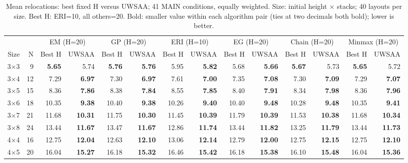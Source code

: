 \begin{table}[t]
\centering\scriptsize
\caption{Mean relocations: best fixed H versus UWSAA; 41 MAIN conditions, equally weighted. Size: initial height $\times$ stacks; 40 layouts per size. Best H: ERI=10, all others=20. Bold: smaller value within each algorithm pair (ties at two decimals both bold); lower is better.}
\setlength{\tabcolsep}{4pt}
\begin{tabular}{rrrrrrrrrrrrrr}
\toprule
 &  & \multicolumn{2}{c}{EM (H=20)} & \multicolumn{2}{c}{GP (H=20)} & \multicolumn{2}{c}{ERI (H=10)} & \multicolumn{2}{c}{EG (H=20)} & \multicolumn{2}{c}{Chain (H=20)} & \multicolumn{2}{c}{Minmax (H=20)} \\
\cmidrule(lr){3-4} \cmidrule(lr){5-6} \cmidrule(lr){7-8} \cmidrule(lr){9-10} \cmidrule(lr){11-12} \cmidrule(lr){13-14}
Size & N & Best H & UWSAA & Best H & UWSAA & Best H & UWSAA & Best H & UWSAA & Best H & UWSAA & Best H & UWSAA \\
\midrule
3$\times$3 & 9 & \textbf{5.65} & 5.74 & \textbf{5.76} & \textbf{5.76} & 5.95 & \textbf{5.82} & 5.68 & \textbf{5.66} & \textbf{5.67} & 5.73 & \textbf{5.65} & 5.72 \\
3$\times$4 & 12 & 7.29 & \textbf{6.97} & 7.30 & \textbf{6.97} & 7.61 & \textbf{7.00} & 7.35 & \textbf{7.08} & 7.30 & \textbf{7.09} & 7.29 & \textbf{7.07} \\
3$\times$5 & 15 & 8.36 & \textbf{7.86} & 8.38 & \textbf{7.84} & 8.55 & \textbf{7.85} & 8.40 & \textbf{7.91} & 8.34 & \textbf{7.98} & 8.36 & \textbf{7.96} \\
3$\times$6 & 18 & 10.35 & \textbf{9.38} & 10.40 & \textbf{9.38} & 10.26 & \textbf{9.40} & 10.40 & \textbf{9.48} & 10.28 & \textbf{9.48} & 10.35 & \textbf{9.41} \\
3$\times$7 & 21 & 11.68 & \textbf{10.31} & 11.75 & \textbf{10.30} & 11.45 & \textbf{10.39} & 11.79 & \textbf{10.39} & 11.53 & \textbf{10.38} & 11.68 & \textbf{10.34} \\
3$\times$8 & 24 & 13.44 & \textbf{11.67} & 13.47 & \textbf{11.67} & 12.86 & \textbf{11.74} & 13.44 & \textbf{11.82} & 13.25 & \textbf{11.79} & 13.44 & \textbf{11.73} \\
4$\times$4 & 16 & 12.75 & \textbf{12.04} & 12.63 & \textbf{12.10} & 13.06 & \textbf{12.14} & 12.79 & \textbf{12.00} & 12.75 & \textbf{12.15} & 12.75 & \textbf{12.10} \\
4$\times$5 & 20 & 16.04 & \textbf{15.27} & 16.18 & \textbf{15.32} & 16.46 & \textbf{15.42} & 16.18 & \textbf{15.38} & 16.10 & \textbf{15.48} & 16.04 & \textbf{15.36} \\

\end{tabular}
\end{table}
